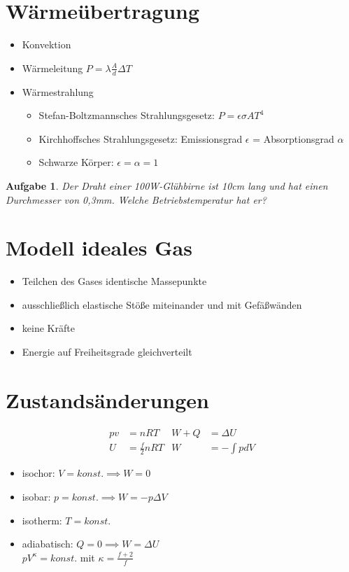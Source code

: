 \documentclass[a4paper,12pt]{extarticle}
\theoremstyle{problemstyle}
\newtheorem{problem}{Aufgabe}
\begin{document}
\begin{multicols}{2}
\section*{Wärmeübertragung}
\begin{itemize}
\item Konvektion
\item Wärmeleitung $P = \lambda\frac{A}{d} \Delta T$
\item Wärmestrahlung
\begin{itemize}
\item Stefan-Boltzmannsches Strahlungsgesetz: $P = \epsilon \sigma A T^4$
\item Kirchhoffsches Strahlungsgesetz: Emissionsgrad $\epsilon$ = Absorptionsgrad $\alpha$
\item Schwarze Körper: $\epsilon = \alpha = 1$
\end{itemize}
\end{itemize}
\begin{problem}
Der Draht einer 100W-Glühbirne ist 10cm lang und hat einen Durchmesser von 0,3mm. Welche Betriebstemperatur hat er?
\end{problem}
\section*{Modell ideales Gas}
\begin{itemize}
\item Teilchen des Gases identische Massepunkte
\item ausschließlich elastische Stöße miteinander und mit Gefäßwänden
\item keine Kräfte
\item Energie auf Freiheitsgrade gleichverteilt
\end{itemize}
\section*{Zustandsänderungen}
\begin{align*}
pv &= nRT & W + Q &= \Delta U \\
U &= \frac{f}{2}nRT & W &= -\int p dV
\end{align*}
\begin{itemize}
\item isochor: $V=konst. \implies W=0$
\item isobar: $p=konst. \implies W = -p\Delta V$
\item isotherm: $T=konst.$
\item adiabatisch: $Q = 0 \implies W = \Delta U$ \\
$pV^\kappa = konst.$ mit $\kappa = \frac{f+2}{f}$
\end{itemize}

\end{multicols}
\end{document}
